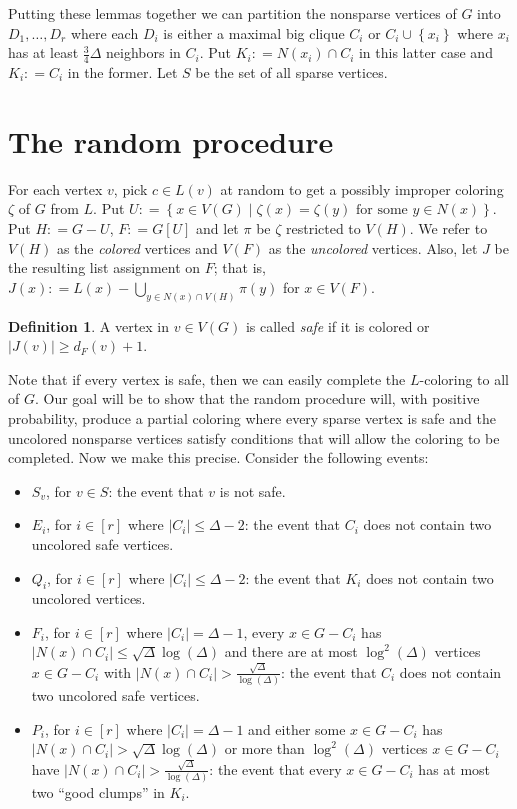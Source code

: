 \documentclass[12pt]{amsart}
\theoremstyle{plain}
\theoremstyle{definition}
\newtheorem{defn}{Definition}
\theoremstyle{remark}
\newcommand{\set}[1]{\left\{ #1 \right\}}
\newcommand{\setb}[3]{\left\{ #1 \in #2 \mid #3 \right\}}
\newcommand{\card}[1]{\left|#1\right|}
\newcommand{\irange}[1]{\left[#1\right]}
\newcommand{\DefinedAs}{\mathrel{\mathop:}=}
\begin{document}
Putting these lemmas together we can partition the nonsparse vertices of $G$
into $D_1, \ldots, D_r$ where each $D_i$ is either a maximal big clique $C_i$ or
$C_i \cup \set{x_i}$ where $x_i$ has at least $\frac34 \Delta$ neighbors in
$C_i$. Put $K_i \DefinedAs N(x_i) \cap C_i$ in this latter case and $K_i
\DefinedAs C_i$ in the former.  Let $S$ be the set of all sparse vertices.

\section{The random procedure}
For each vertex $v$, pick $c \in L(v)$ at random to get a possibly improper
coloring $\zeta$ of $G$ from $L$.  Put $U \DefinedAs \setb{x}{V(G)}{\zeta(x) =
\zeta(y) \text{ for some $y \in N(x)$}}$.  Put $H \DefinedAs G - U$, $F
\DefinedAs G[U]$ and let $\pi$ be $\zeta$ restricted to $V(H)$.  We refer
to $V(H)$ as the \emph{colored} vertices and $V(F)$ as the \emph{uncolored}
vertices.  Also, let $J$ be the resulting list assignment on $F$; that is, $J(x)
\DefinedAs L(x) - \bigcup_{y \in N(x) \cap V(H)} \pi(y)$ for $x \in V(F)$.

\begin{defn}
A vertex in $v \in V(G)$ is called \emph{safe} if it is colored or $\card{J(v)}
\geq d_F(v) + 1$.
\end{defn}

Note that if every vertex is safe, then we can easily complete the $L$-coloring
to all of $G$.  Our goal will be to show that the random procedure will, with
positive probability, produce a partial coloring where every sparse vertex is
safe and the uncolored nonsparse vertices satisfy conditions that will allow the
coloring to be completed.  Now we make this precise.  Consider the following
events:

\begin{itemize}
  \item $S_v$, for $v \in S$: the event that $v$ is not safe.
  \item $E_i$, for $i \in \irange{r}$ where $\card{C_i} \leq \Delta - 2$: the event that $C_i$ does not contain two uncolored safe vertices.
  \item $Q_i$, for $i \in \irange{r}$ where $\card{C_i} \leq \Delta - 2$: the event that $K_i$ does not contain two uncolored vertices.
  \item $F_i$, for $i \in \irange{r}$ where $\card{C_i} = \Delta - 1$, every $x
  \in G - C_i$ has $\card{N(x) \cap C_i} \leq \sqrt{\Delta}\log(\Delta)$ and
  there are at most $\log^2(\Delta)$ vertices $x \in G - C_i$ with $\card{N(x)
  \cap C_i} > \frac{\sqrt{\Delta}}{\log(\Delta)}$: the event that
  $C_i$ does not contain two uncolored safe vertices.
  \item $P_i$, for $i \in \irange{r}$ where $\card{C_i} = \Delta - 1$ and either some $x \in G
  - C_i$ has $\card{N(x) \cap C_i} > \sqrt{\Delta}\log(\Delta)$ or more than
  $\log^2(\Delta)$ vertices $x \in G - C_i$ have $\card{N(x) \cap C_i} >
  \frac{\sqrt{\Delta}}{\log(\Delta)}$: the event that every $x \in G - C_i$ has
  at most two ``good clumps'' in $K_i$.
\end{itemize}
\end{document}
